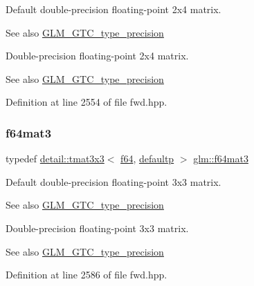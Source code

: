 Default double-\/precision floating-\/point 2x4 matrix. \begin{DoxySeeAlso}{See also}
\hyperlink{group__gtc__type__precision}{G\+L\+M\+\_\+\+G\+T\+C\+\_\+type\+\_\+precision}
\end{DoxySeeAlso}
Double-\/precision floating-\/point 2x4 matrix. \begin{DoxySeeAlso}{See also}
\hyperlink{group__gtc__type__precision}{G\+L\+M\+\_\+\+G\+T\+C\+\_\+type\+\_\+precision} 
\end{DoxySeeAlso}


Definition at line 2554 of file fwd.\+hpp.

\mbox{\label{group__gtc__type__precision_gaa9e69ab90c0130b9a84a0a7fd8e49664}} 
\subsubsection{\texorpdfstring{f64mat3}{f64mat3}}
{\footnotesize\ttfamily typedef \hyperlink{structglm_1_1detail_1_1tmat3x3}{detail\+::tmat3x3}$<$ \hyperlink{group__gtc__type__precision_ga2bba392e555124b36cde6abba349bab3}{f64}, \hyperlink{namespaceglm_a0f04f086094c747d227af4425893f545a9d21ccd8b5a009ec7eb7677befc3bf51}{defaultp} $>$ \hyperlink{group__gtc__type__precision_gaa9e69ab90c0130b9a84a0a7fd8e49664}{glm\+::f64mat3}}

Default double-\/precision floating-\/point 3x3 matrix. \begin{DoxySeeAlso}{See also}
\hyperlink{group__gtc__type__precision}{G\+L\+M\+\_\+\+G\+T\+C\+\_\+type\+\_\+precision}
\end{DoxySeeAlso}
Double-\/precision floating-\/point 3x3 matrix. \begin{DoxySeeAlso}{See also}
\hyperlink{group__gtc__type__precision}{G\+L\+M\+\_\+\+G\+T\+C\+\_\+type\+\_\+precision} 
\end{DoxySeeAlso}


Definition at line 2586 of file fwd.\+hpp.

\mbox{\label{group__gtc__type__precision_gae6388c7664b5bb281047a9fd7984f97b}} 

